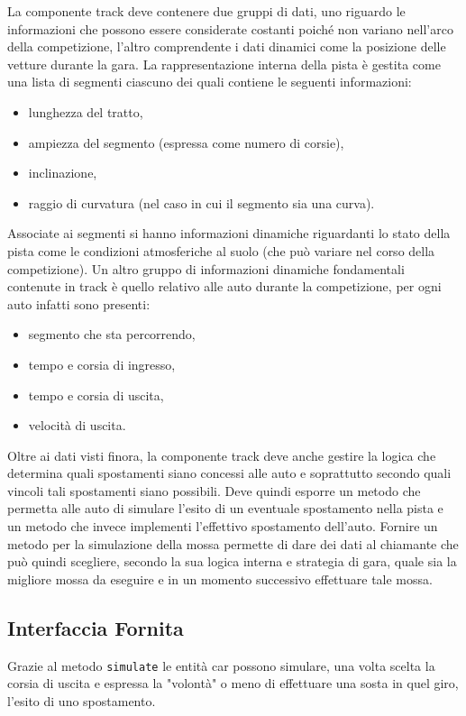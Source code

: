 \documentclass[11pt,a4paper]{report}
\newcommand{\fun}[1]{\texttt{#1}}
\begin{document}
La componente track deve contenere due gruppi di dati, uno riguardo le informazioni che possono essere considerate costanti poiché non variano nell'arco della competizione, l'altro comprendente i dati dinamici come la posizione delle vetture durante la gara.
La rappresentazione interna della pista è gestita come una lista di segmenti ciascuno dei quali contiene le seguenti informazioni:
\begin{itemize}
\item lunghezza del tratto,
\item ampiezza del segmento (espressa come numero di corsie),
\item inclinazione,
\item raggio di curvatura (nel caso in cui il segmento sia una curva).
\end{itemize}
Associate ai segmenti si hanno informazioni dinamiche riguardanti lo stato della pista come le condizioni atmosferiche al suolo (che può variare nel corso della competizione).
Un altro gruppo di informazioni dinamiche fondamentali contenute in track è quello relativo alle auto durante la competizione, per ogni auto infatti sono presenti:
\begin{itemize}
\item segmento che sta percorrendo,
\item tempo e corsia di ingresso,
\item tempo e corsia di uscita,
\item velocità di uscita.
\end{itemize}

Oltre ai dati visti finora, la componente track deve anche gestire la logica che determina quali spostamenti siano concessi alle auto e soprattutto secondo quali vincoli tali spostamenti siano possibili. Deve quindi esporre un metodo che permetta alle auto di simulare l'esito di un eventuale spostamento nella pista e un metodo che invece implementi l'effettivo spostamento dell'auto. Fornire un metodo per la simulazione della mossa permette di dare dei dati al chiamante che può quindi scegliere, secondo la sua logica interna e strategia di gara, quale sia la migliore mossa da eseguire e in un momento successivo effettuare tale mossa.
\subsection*{Interfaccia Fornita}
Grazie al metodo \fun{simulate} le entità car possono simulare, una volta scelta la corsia di uscita e espressa la "volontà" o meno di effettuare una sosta in quel giro, l'esito di uno spostamento.
\end{document}
